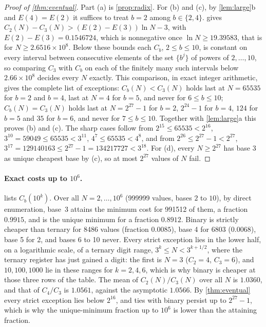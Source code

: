 \documentclass[11pt]{article}
\theoremstyle{definition}\newtheorem{definition}[theorem]{Definition}
\theoremstyle{remark}\newtheorem{remark}[theorem]{Remark}
\begin{document}
\begin{proof}[Proof of \cref{thm:eventual}]
Part (a) is \cref{prop:radix}. For (b) and (c), by \cref{lem:large}b and $E(4)=E(2)$ it suffices to treat $b=2$ among $b\in\{2,4\}$.  gives $C_2(N)-C_3(N)>(E(2)-E(3))\ln N-3$, with $E(2)-E(3)=0.1546724$, which is nonnegative once $\ln N\ge19.39583$, that is for $N\ge2.6516\times10^{8}$. Below these bounds each $C_b$, $2\le b\le10$, is constant on every interval between consecutive elements of the set $\{b^j\}$ of powers of $2,\dots,10$, so comparing $C_3$ with $C_b$ on each of the finitely many such intervals below $2.66\times10^8$ decides every $N$ exactly. This comparison, in exact integer arithmetic, gives the complete list of exceptions: $C_b(N)<C_3(N)$ holds last at $N=65535$ for $b=2$ and $b=4$, last at $N=4$ for $b=5$, and never for $6\le b\le10$; $C_b(N)=C_3(N)$ holds last at $N=2^{27}-1$ for $b=2$, $2^{24}-1$ for $b=4$, $124$ for $b=5$ and $35$ for $b=6$, and never for $7\le b\le10$. Together with \cref{lem:large}a this proves (b) and (c). The sharp cases follow from $2^{15}\le65535<2^{16}$, $3^{10}=59049\le65535<3^{11}$, $4^7\le65535<4^8$, and from $2^{26}\le2^{27}-1<2^{27}$, $3^{17}=129140163\le2^{27}-1=134217727<3^{18}$. For (d), every $N\ge2^{27}$ has base 3 as unique cheapest base by (c), so at most $2^{27}$ values of $N$ fail.
\end{proof}

\paragraph{Exact costs up to $10^6$.}  lists $C_b(10^k)$. Over all $N=2,\dots,10^6$ (999999 values, bases $2$ to $10$), by direct enumeration, base~3 attains the minimum cost for 991512 of them, a fraction $0.9915$, and is the unique minimum for a fraction $0.8912$. Binary is strictly cheaper than ternary for 8486 values (fraction $0.0085$), base 4 for 6803 ($0.0068$), base 5 for 2, and bases 6 to 10 never. Every strict exception lies in the lower half, on a logarithmic scale, of a ternary digit range, $3^k\le N<3^{k+1/2}$, where the ternary register has just gained a digit: the first is $N=3$ ($C_2=4$, $C_3=6$), and $10,100,1000$ lie in these ranges for $k=2,4,6$, which is why binary is cheaper at those three rows of the table. The mean of $C_2(N)/C_3(N)$ over all $N$ is $1.0360$, and that of $C_4/C_3$ is $1.0561$, against the asymptotic $1.0566$. By \cref{thm:eventual} every strict exception lies below $2^{16}$, and ties with binary persist up to $2^{27}-1$, which is why the unique-minimum fraction up to $10^6$ is lower than the attaining fraction.
\end{document}
